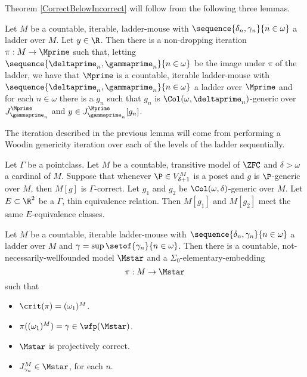 \documentclass[oneside,12pt]{amsart}
\begin{document}
Theorem \ref{CorrectBelowIncorrect} will follow from the following three lemmas.

\begin{lemma}
\label{generic_over_all_windows}
Let $M$ be a countable, iterable, ladder-mouse
with $\sequence{\delta_n,\gamma_n}{n\in\omega}$ a ladder over $M$.
Let $y\in\R$.
Then there is a non-dropping iteration $\pi:M\to \Mprime$ such that,
letting $\sequence{\deltaprime_n,\gammaprime_n}{n\in\omega}$ be the image under $\pi$
of the ladder, we have that $\Mprime$ is a countable, iterable ladder-mouse
with $\sequence{\deltaprime_n,\gammaprime_n}{n\in\omega}$ a ladder over $\Mprime$
and for each $n\in\omega$ there is a $g_n$ such that $g_n$
is $\Col(\omega,\deltaprime_n)$-generic over
$J^{\Mprime}_{\gammaprime_n}$ and $y\in J^{\Mprime}_{\gammaprime_n}[g_n]$.
\end{lemma}

The iteration described in the previous lemma will come from performing a
Woodin genericity iteration over each of the levels of the ladder sequentially.

\begin{lemma}
\label{hjorthlemma}
Let $\Gamma$ be a pointclass.
Let $M$ be a countable, transitive model of $\ZFC$ and  $\delta>\omega$ a cardinal of $M$.
Suppose that whenever $\P\in V^M_{\delta+1}$ is a poset and $g$ is $\P$-generic over $M$, then
$M[g]$ is $\Gamma$-correct. Let $g_1$ and $g_2$ be $\Col(\omega, \delta)$-generic over $M$.
Let $E\subset\R^2$ be a $\Gamma$, thin equivalence relation.
Then $M[g_1]$ and $M[g_2]$ meet the same $E$-equivalence classes.
\end{lemma}

\begin{lemma}
\label{m_star_existence}
Let $M$ be a countable, iterable ladder-mouse
with $\sequence{\delta_n,\gamma_n}{n\in\omega}$ a ladder over $M$ and
$\gamma=\sup\setof{\gamma_n}{n\in\omega}$. Then there is a countable,
not-necessarily-wellfounded model $\Mstar$ and a $\Sigma_0$-elementary-embedding
$$\pi:M\to\Mstar$$
such that
\begin{itemize}
\item $\crit(\pi) = (\omega_1)^M$.
\item $\pi((\omega_1)^M) = \gamma \in \wfp(\Mstar)$.
\item $\Mstar$ is projectively correct.
\item $J^{M}_{\gamma_n}\in\Mstar$, for each $n$.
\end{itemize}
\end{lemma}
\end{document}
